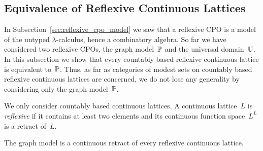 

\subsection{Equivalence of Reflexive Continuous Lattices}
\label{sec:equivalence_reflexive_continuous_lattices}%

%
%

In Subsection~\ref{sec:reflexive_cpo_model} we saw that a reflexive
CPO is a model of the untyped $\lambda$-calculus, hence a combinatory
algebra. So far we have considered two reflexive CPOs, the graph
model~$\mathbb{P}$ and the universal domain~$\mathbb{U}$. In this subsection we show
that every countably based reflexive continuous lattice is equivalent
to~$\mathbb{P}$. Thus, as far as categories of modest sets on countably based
reflexive continuous lattices are concerned, we do not lose any
generality by considering only the graph model~$\mathbb{P}$.

We only consider countably based continuous lattices.
%
%
%
%
A continuous lattice~$L$ is \emph{reflexive} if it contains at least
two elements and its continuous function space~$L^L$ is a retract
of~$L$.

\begin{proposition}
  \label{th:PP_retract_of_reflexive_lattice}%
  The graph model is a continuous retract of every reflexive
  continuous lattice.
\end{proposition}

